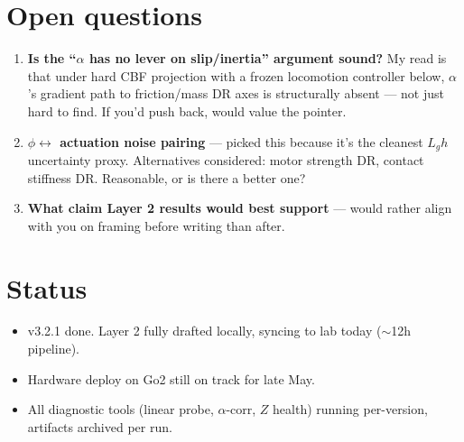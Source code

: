 \documentclass[11pt]{article}
\begin{document}
\section*{Open questions}

\begin{enumerate}
\item \textbf{Is the ``$\alpha$ has no lever on slip/inertia'' argument sound?} My read is that under hard CBF projection with a frozen locomotion controller below, $\alpha$'s gradient path to friction/mass DR axes is structurally absent --- not just hard to find. If you'd push back, would value the pointer.
\item \textbf{$\phi \leftrightarrow$ actuation noise pairing} --- picked this because it's the cleanest $L_g h$ uncertainty proxy. Alternatives considered: motor strength DR, contact stiffness DR. Reasonable, or is there a better one?
\item \textbf{What claim Layer 2 results would best support} --- would rather align with you on framing before writing than after.
\end{enumerate}

\section*{Status}

\begin{itemize}
\item v3.2.1 done. Layer 2 fully drafted locally, syncing to lab today ($\sim$12h pipeline).
\item Hardware deploy on Go2 still on track for late May.
\item All diagnostic tools (linear probe, $\alpha$-corr, $Z$ health) running per-version, artifacts archived per run.
\end{itemize}
\end{document}
